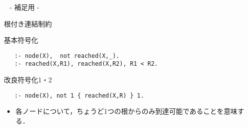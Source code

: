\appendix
\backupbegin

\begin{frame}{~}
 \centering
 - 補足用 -
\end{frame} 

\begin{frame}[fragile]{根付き連結制約}
\begin{exampleblock}{基本符号化}\small
\begin{lstlisting}
   :- node(X),  not reached(X,_).
   :- reached(X,R1), reached(X,R2), R1 < R2.
\end{lstlisting}
\end{exampleblock}
\begin{exampleblock}{改良符号化1・2}\small
\begin{lstlisting}
   :- node(X), not 1 { reached(X,R) } 1.
\end{lstlisting}
\end{exampleblock}
\vfill
\begin{itemize}
\item 各ノードについて，ちょうど1つの根からのみ到達可能であることを意味する．
\end{itemize}
\end{frame}
